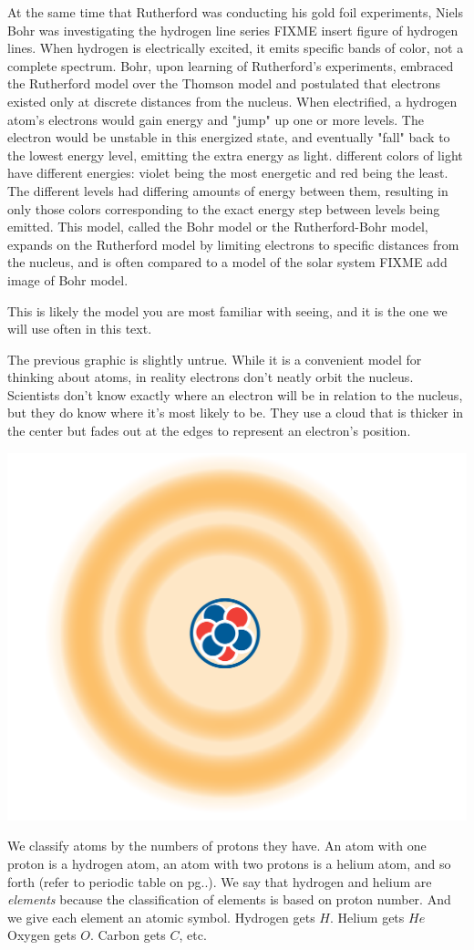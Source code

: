 At the same time that Rutherford was conducting his gold foil experiments, Niels 
Bohr was investigating the hydrogen line series FIXME insert figure of hydrogen 
lines. When hydrogen is electrically excited, it emits specific bands of color, 
not a complete spectrum. Bohr, upon learning of Rutherford's experiments, 
embraced the Rutherford model over the Thomson model and postulated that electrons 
existed only at discrete distances from the nucleus. When electrified, a hydrogen 
atom's electrons would gain energy and "jump" up one or more levels. The electron 
would be unstable in this energized state, and eventually "fall" back to the 
lowest energy level, emitting the extra energy as light. different colors of 
light have different energies: violet being the most energetic and red being the 
least. The different levels had differing amounts of energy between them, 
resulting in only those colors corresponding to the exact energy step between 
levels being emitted. This model, called the Bohr model or the Rutherford-Bohr 
model, expands on the Rutherford model by limiting electrons to specific 
distances from the nucleus, and is often compared to a model of the solar system 
FIXME add image of Bohr model. 

This is likely the model you are most familiar with seeing, and it is the one we 
will use often in this text. 


The previous graphic is slightly untrue. While it is a convenient model for 
thinking about atoms, in reality electrons don't neatly orbit the nucleus. 
Scientists don't know exactly where an electron will be in relation to the 
nucleus, but they do know where it's most likely to be. They use a cloud that is 
thicker in the center but fades out at the edges to represent an electron's 
position.


\includegraphics[width=.5\textwidth]{atomCloud.png}


We classify atoms by the numbers of protons they have. An atom with one proton is a
hydrogen atom, an atom with two protons is a helium atom, and so forth (refer to periodic table on pg..). We say that hydrogen and helium are \textit{elements} because the classification of elements is based on proton number. And we give
each element an atomic symbol. Hydrogen gets $H$. Helium gets $He$ Oxygen gets
$O$. Carbon gets $C$, etc.


